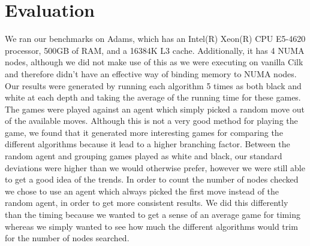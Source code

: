 \documentclass[]{article}
\begin{document}
\section{Evaluation}
We ran our benchmarks on Adams, which has an Intel(R) Xeon(R) CPU E5-4620 processor, 500GB of RAM, and a 16384K L3 cache.  Additionally, it has 4 NUMA nodes, although we did not make use of this as we were executing on vanilla Cilk and therefore didn't have an effective way of binding memory to NUMA nodes.  Our results were generated by running each algorithm 5 times as both black and white at each depth and taking the average of the running time for these games.  The games were played against an agent which simply picked a random move out of the available moves.  Although this is not a very good method for playing the game, we found that it generated more interesting games for comparing the different algorithms because it lead to a higher branching factor.  Between the random agent and grouping games played as white and black, our standard deviations were higher than we would otherwise prefer, however we were still able to get a good idea of the trends.  In order to count the number of nodes checked we chose to use an agent which always picked the first move instead of the random agent, in order to get more consistent results.  We did this differently than the timing because we wanted to get a sense of an average game for timing whereas we simply wanted to see how much the different algorithms would trim for the number of nodes searched.
\end{document}
